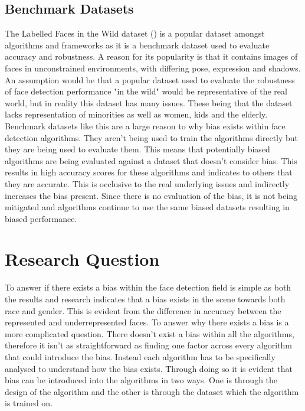 \documentclass{l4proj}
\begin{document}
\subsection{Benchmark Datasets}
The Labelled Faces in the Wild dataset (\cite{300w}) is a popular dataset amongst algorithms and frameworks as it is a benchmark dataset used to evaluate accuracy and robustness. A reason for its popularity is that it contains images of faces in unconstrained environments, with differing pose, expression and shadows. An assumption would be that a popular dataset used to evaluate the robustness of face detection performance "in the wild" would be representative of the real world, but in reality this dataset has many issues. These being that the dataset lacks representation of minorities as well as women, kids and the elderly. Benchmark datasets like this are a large reason to why bias exists within face detection algorithms. They aren't being used to train the algorithms directly but they are being used to evaluate them. This means that potentially biased algorithms are being evaluated against a dataset that doesn't consider bias. This results in high accuracy scores for these algorithms and indicates to others that they are accurate. This is occlusive to the real underlying issues and indirectly increases the bias present. Since there is no evaluation of the bias, it is not being mitigated and algorithms continue to use the same biased datasets resulting in biased performance. 
\section{Research Question}
To answer if there exists a bias within the face detection field is simple as both the results and research indicates that a bias exists in the scene towards both race and gender. This is evident from the difference in accuracy between the represented and underrepresented faces. To answer why there exists a bias is a more complicated question. There doesn't exist a bias within all the algorithms, therefore it isn't as straightforward as finding one factor across every algorithm that could introduce the bias. Instead each algorithm has to be specifically analysed to understand how the bias exists. Through doing so it is evident that bias can be introduced into the algorithms in two ways. One is through the design of the algorithm and the other is through the dataset which the algorithm is trained on. 
\end{document}
